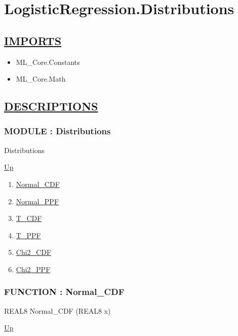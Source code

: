 \chapter*{LogisticRegression.Distributions}
\hypertarget{ecldoc:toc:LogisticRegression.Distributions}{}

\section*{\underline{IMPORTS}}
\begin{itemize}
\item ML\_Core.Constants
\item ML\_Core.Math
\end{itemize}

\section*{\underline{DESCRIPTIONS}}
\subsection*{MODULE : Distributions}
\hypertarget{ecldoc:LogisticRegression.Distributions}{}
\begin{minipage}[t]{\textwidth}
\begin{flushleft}
 Distributions 
\end{flushleft}
\end{minipage}
\hyperlink{ecldoc:toc:LogisticRegression}{Up}

\par
\par
\begin{enumerate}
\item \hyperlink{ecldoc:logisticregression.distributions.normal_cdf}{Normal\_CDF}
\item \hyperlink{ecldoc:logisticregression.distributions.normal_ppf}{Normal\_PPF}
\item \hyperlink{ecldoc:logisticregression.distributions.t_cdf}{T\_CDF}
\item \hyperlink{ecldoc:logisticregression.distributions.t_ppf}{T\_PPF}
\item \hyperlink{ecldoc:logisticregression.distributions.chi2_cdf}{Chi2\_CDF}
\item \hyperlink{ecldoc:logisticregression.distributions.chi2_ppf}{Chi2\_PPF}
\end{enumerate}
\subsection*{FUNCTION : Normal\_CDF}
\hypertarget{ecldoc:logisticregression.distributions.normal_cdf}{}
\begin{minipage}[t]{\textwidth}
\begin{flushleft}
REAL8 Normal\_CDF (REAL8 x)
\end{flushleft}
\end{minipage}
\hyperlink{ecldoc:LogisticRegression.Distributions}{Up}


